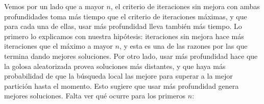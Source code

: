 \begin{figure}[H]
    \begin{minipage}[t]{\linewidth}
		\centering
		\label{fig:ejercicio-5-tiempos-grasp-conjunto-1}
    \end{minipage}
\end{figure}

Vemos por un lado que a mayor $n$, el criterio de iteraciones sin mejora con ambas profundidades toma más tiempo que el criterio de iteraciones máximas, y que para cada una de ellas, usar más profundidad lleva también más tiempo. Lo primero lo explicamos con nuestra hipótesis: iteraciones sin mejora hace más iteraciones que el máximo a mayor $n$, y esta es una de las razones por las que termina dando mejores soluciones. Por otro lado, usar más profundidad hace que la golosa aleatorizada provea soluciones más distantes, y que haya más probabilidad de que la búsqueda local las mejore para superar a la mejor partición hasta el momento. Esto sugiere que usar más profundidad genera mejores soluciones. Falta ver qué ocurre para los primeros $n$:

